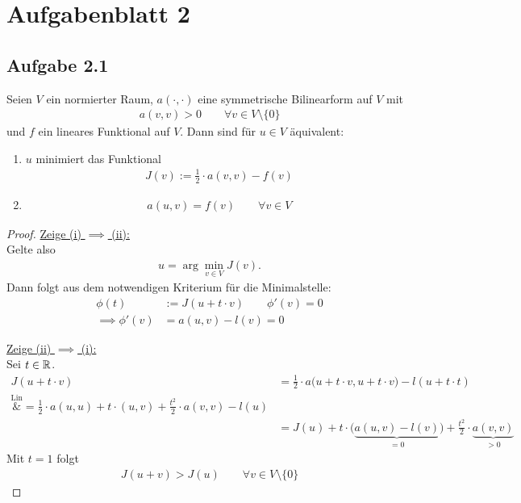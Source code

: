 
\section{Aufgabenblatt 2}
\subsection{Aufgabe 2.1}
Seien $V$ ein normierter Raum, $a(\cdot,\cdot)$ eine symmetrische Bilinearform auf $V$ mit
\begin{align*}
	a(v,v)>0\qquad\forall v\in V\setminus\lbrace0\rbrace
\end{align*}
und $f$ ein lineares Funktional auf $V$. Dann sind für $u\in V$ äquivalent:
\begin{enumerate}[label=(\roman*)]
	\item $u$ minimiert das Funktional 
	\begin{align}\label{Variationsproblem}\tag{Variationsproblem}
		J(v):=\frac{1}{2}\cdot a(v,v)-f(v)
	\end{align}
	\item 
	\begin{align}\label{Variationsgleichung}\tag{Variationsgleichung}
		a(u,v)=f(v)\qquad\forall v\in V
	\end{align}
\end{enumerate}

\begin{proof}
	\underline{Zeige (i) $\implies$ (ii):}\\
	Gelte also 
	\begin{align*}
		u=\arg\min\limits_{v\in V} J(v).
	\end{align*}
	Dann folgt aus dem notwendigen Kriterium für die Minimalstelle:
	\begin{align*}
		\phi(t)&:=J(u+t\cdot v)\qquad\phi'(v)=0\\
		\implies
		\phi'(v)&=a(u,v)-l(v)=0
	\end{align*}

	\underline{Zeige (ii) $\implies$ (i):}\\
	Sei $t\in\mathbb{R}$.
	\begin{align*}
		J(u+t\cdot v)&=
		\frac{1}{2}\cdot a\big(u+t\cdot v,u+t\cdot v\big)-l(u+t\cdot t)\\
		\overset{\text{Lin}}&=
		\frac{1}{2}\cdot a(u,u)+t\cdot (u,v)+\frac{t^2}{2}\cdot a(v,v)-l(u)\\
		&=J(u)+t\cdot\big(\underbrace{a(u,v)-l(v)}_{=0}\big)+\frac{t^2}{2}\cdot \underbrace{a(v,v)}_{>0}
	\end{align*}
	Mit $t=1$ folgt
	\begin{align*}
		J(u+v)>J(u)\qquad\forall v\in V\setminus\lbrace 0\rbrace
	\end{align*}
\end{proof}

